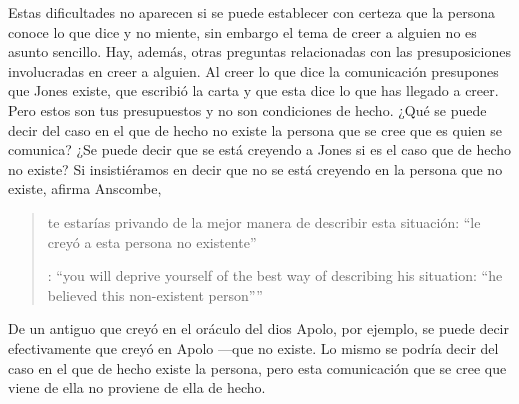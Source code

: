 Estas dificultades no aparecen si se puede establecer con certeza que la persona conoce lo que dice y no miente, sin embargo el tema de creer a alguien no es asunto sencillo. Hay, además, otras preguntas relacionadas con las presuposiciones involucradas en creer a alguien. Al creer lo que dice la comunicación presupones que Jones existe, que escribió la carta y que esta dice lo que has llegado a creer. Pero estos son tus presupuestos y no son condiciones de hecho. ¿Qué se puede decir del caso en el que de hecho no existe la persona que se cree que es quien se comunica? ¿Se puede decir que se está creyendo a Jones si es el caso que de hecho no existe? Si insistiéramos en decir que no se está creyendo en la persona que no existe, afirma Anscombe, \blockquote[{\cite[117]{anscombe1981erp:faith}}: \enquote{you will deprive yourself of the best way of describing his situation: ``he believed this non-existent person''}]{te estarías privando de la mejor manera de describir esta situación: ``le creyó a esta persona no existente''}. De un antiguo que creyó en el oráculo del dios Apolo, por ejemplo, se puede decir efectivamente que creyó en Apolo ---que no existe. Lo mismo se podría decir del caso en el que de hecho existe la persona, pero esta comunicación que se cree que viene de ella no proviene de ella de hecho.

